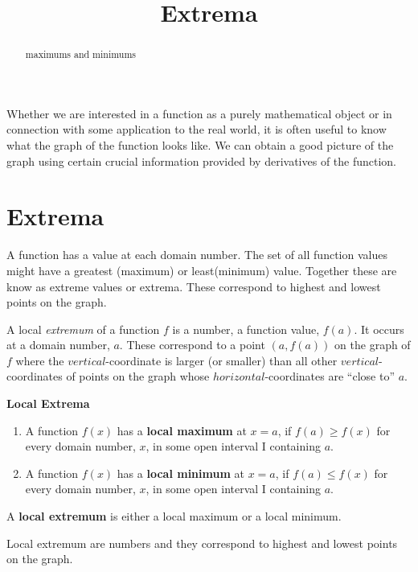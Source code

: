 \documentclass{ximera}
\title{Extrema}
\begin{document}
\begin{abstract}
maximums and minimums
\end{abstract}
\maketitle


Whether we are interested in a function as a purely mathematical
object or in connection with some application to the real world, it is
often useful to know what the graph of the function looks like. We can
obtain a good picture of the graph using certain crucial information
provided by derivatives of the function.

\section*{Extrema}

A function has a value at each domain number. The set of all function values might have a greatest (maximum) or least(minimum) value. Together these are know as extreme values or extrema.  These correspond to highest and lowest points on the graph.


A local \textit{extremum} of a function $f$ is a number, a function value, $f(a)$. It occurs at a domain number, $a$. These correspond to a point $(a,f(a))$ on the graph of $f$ where the
$vertical$-coordinate is larger (or smaller) than all other $vertical$-coordinates
 of points on the graph whose $horizontal$-coordinates are ``close to''  $a$. 

\begin{definition} \textbf{\textcolor{green!50!black}{Local Extrema}}


\begin{enumerate}
\item A function $f(x)$ has a \textbf{local maximum} at $x=a$, if $f(a)\ge
  f(x)$ for every domain number, $x$, in some open interval I containing $a$.
\item A function $f(x)$ has a \textbf{local minimum} at $x=a$, if $f(a)\le
  f(x)$ for every domain number, $x$,  in some open interval I containing $a$.
\end{enumerate}
A \textbf{local extremum} is either a local
maximum or a local minimum.
\end{definition}

Local extremum are numbers and they correspond to highest and lowest points on the graph.
\end{document}

